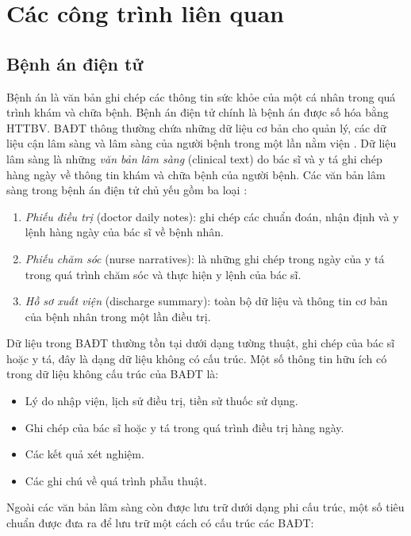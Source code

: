 \chapter{Các công trình liên quan}
\section{Bệnh án điện tử}
Bệnh án là văn bản ghi chép các thông tin sức khỏe của một cá nhân trong quá trình khám và chữa bệnh. Bệnh án điện tử chính là bệnh án được số hóa bằng HTTBV. BAĐT thông thường chứa những dữ liệu cơ bản cho quản lý, các dữ liệu cận lâm sàng và lâm sàng của người bệnh trong một lần nằm viện \cite{HoTuBao2015}. Dữ liệu lâm sàng là những \textit{văn bản lâm sàng} (clinical text) do bác sĩ và y tá ghi chép hàng ngày về thông tin khám và chữa bệnh của người bệnh. Các văn bản lâm sàng trong bệnh án điện tử chủ yếu gồm ba loại \cite{HoTuBao2015}:

\begin{enumerate}[leftmargin=\the\parindent]
\item \emph{Phiếu điều trị} (doctor daily notes): ghi chép các chuẩn đoán, nhận định và y lệnh hàng ngày của bác sĩ về bệnh nhân.
\item \emph{Phiếu chăm sóc} (nurse narratives): là những ghi chép trong ngày của y tá trong quá trình chăm sóc và thực hiện y lệnh của bác sĩ.
\item \emph{Hồ sơ xuất viện} (discharge summary): toàn bộ dữ liệu và thông tin cơ bản của bệnh nhân trong một lần điều trị.
\end{enumerate}

Dữ liệu trong BAĐT thường tồn tại dưới dạng tường thuật, ghi chép của bác sĩ hoặc y tá, đây là dạng dữ liệu không có cấu trúc. Một số thông tin hữu ích có trong dữ liệu không cấu trúc của BAĐT là:

\begin{itemize}
\item Lý do nhập viện, lịch sử điều trị, tiền sử thuốc sử dụng.
\item Ghi chép của bác sĩ hoặc y tá trong quá trình điều trị hàng ngày.
\item Các kết quả xét nghiệm.
\item Các ghi chú về quá trình phẫu thuật.
\end{itemize}

Ngoài các văn bản lâm sàng còn được lưu trữ dưới dạng phi cấu trúc, một số tiêu chuẩn được đưa ra để lưu trữ một cách có cấu trúc các BAĐT:


